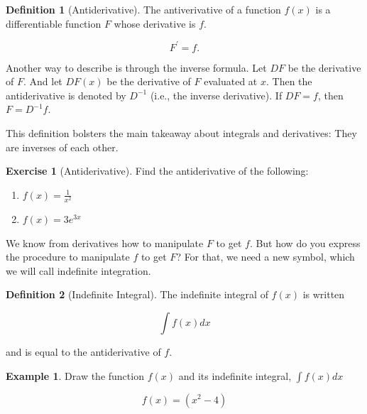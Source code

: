 \documentclass[
]{book}
\providecommand{\tightlist}{%
  \setlength{\itemsep}{0pt}\setlength{\parskip}{0pt}}
\theoremstyle{definition}
\newtheorem{definition}{Definition}[chapter]
\theoremstyle{definition}
\newtheorem{example}{Example}[chapter]
\theoremstyle{definition}
\newtheorem{exercise}{Exercise}[chapter]
\theoremstyle{remark}
\begin{document}
\begin{definition}[Antiderivative]
\protect\hypertarget{def:unnamed-chunk-20}{}{\label{def:unnamed-chunk-20} {} }The antiverivative of a function \(f(x)\) is a differentiable function \(F\) whose derivative is \(f\).

\[F^\prime = f.\]
\end{definition}

Another way to describe is through the inverse formula. Let \(DF\) be the derivative of \(F\). And let \(DF(x)\) be the derivative of \(F\) evaluated at \(x\). Then the antiderivative is denoted by \(D^{-1}\) (i.e., the inverse derivative). If \(DF=f\), then \(F=D^{-1}f\).

This definition bolsters the main takeaway about integrals and derivatives: They are inverses of each other.

\begin{exercise}[Antiderivative]
\protect\hypertarget{exr:unnamed-chunk-21}{}{\label{exr:unnamed-chunk-21} {} }Find the antiderivative of the following:

\begin{enumerate}
\def\labelenumi{\arabic{enumi}.}
\tightlist
\item
  \(f(x) = \frac{1}{x^2}\)
\item
  \(f(x) = 3e^{3x}\)
\end{enumerate}
\end{exercise}

We know from derivatives how to manipulate \(F\) to get \(f\). But how do you express the procedure to manipulate \(f\) to get \(F\)? For that, we need a new symbol, which we will call indefinite integration.

\begin{definition}[Indefinite Integral]
\protect\hypertarget{def:unnamed-chunk-22}{}{\label{def:unnamed-chunk-22} {} }The indefinite integral of \(f(x)\) is written

\[\int f(x) dx \]

and is equal to the antiderivative of \(f\).
\end{definition}

\begin{example}
\protect\hypertarget{exm:unnamed-chunk-23}{}{\label{exm:unnamed-chunk-23} }Draw the function \(f(x)\) and its indefinite integral, \(\int\limits f(x) dx\)

\[f(x) = (x^2-4)\]
\end{example}
\end{document}
